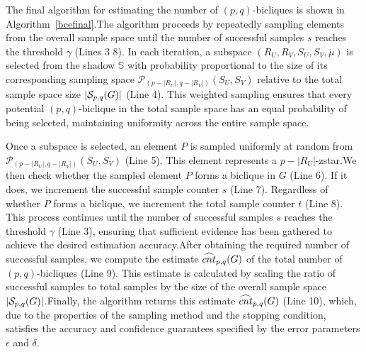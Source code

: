 The final algorithm for estimating the number of $(p,q)$-bicliques is shown in Algorithm~\ref{bcefinal}.The algorithm proceeds by repeatedly sampling elements from the overall sample space until the number of successful samples $s$ reaches the threshold $\gamma$ (Lines 3 8). In each iteration, a subspace $(R_U, R_V, S_U, S_V, \ddot{\mu})$ is selected from the shadow $\mathbb{S}$ with probability proportional to the size of its corresponding sampling space $\mathcal{P}_{(p - |R_U|, q - |R_V|)}(S_U, S_V)$ relative to the total sample space size $|\mathcal{S}_{p,q}(G)|$ (Line 4). This weighted sampling ensures that every potential $(p,q)$-biclique in the total sample space has an equal probability of being selected, maintaining uniformity across the entire sample space.

Once a subspace is selected, an element $P$ is sampled uniformly at random from $\mathcal{P}_{(p - |R_U|, q - |R_V|)}(S_U, S_V)$ (Line 5). This element represents a $p-|R_U|$-zstar.We then check whether the sampled element $P$ forms a biclique in $G$ (Line 6). If it does, we increment the successful sample counter $s$ (Line 7). Regardless of whether $P$ forms a biclique, we increment the total sample counter $t$ (Line 8). This process continues until the number of successful samples $s$ reaches the threshold $\gamma$ (Line 3), ensuring that sufficient evidence has been gathered to achieve the desired estimation accuracy.After obtaining the required number of successful samples, we compute the estimate ${\widehat{cnt}_{p,q}(G) }$ of the total number of $(p,q)$-bicliques (Line 9). This estimate is calculated by scaling the ratio of successful samples to total samples by the size of the overall sample space $|\mathcal{S}_{p,q}(G)|$.Finally, the algorithm returns this estimate ${\widehat{cnt}_{p,q}(G) }$ (Line 10), which, due to the properties of the sampling method and the stopping condition, satisfies the accuracy and confidence guarantees specified by the error parameters $\epsilon$ and $\delta$.


